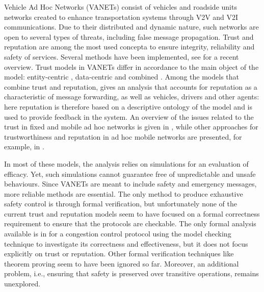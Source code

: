 \documentclass[compsoc, conference, letterpaper, 10pt, times]{IEEEtran}
\begin{document}
Vehicle Ad Hoc Networks (VANETs) consist of vehicles and roadside units networks created to enhance transportation systems through V2V and V2I communications. Due to their distributed and dynamic nature, such networks are open to several types of threats, including false message propagation. Trust and reputation are among the  most used concepta to ensure integrity, reliability and safety of services. Several methods have been implemented, see \cite{Soleymani2015} for a recent overview. Trust models in VANETs differ in accordance to the main object of the model: entity-centric \cite{5641621, GomezMarmol:2012:TTR:2160992.2161100}, data-centric \cite{conf/infocom/RayaPGH08, Lo2009} and combined \cite{Wei2012}. Among the models that combine trust and reputation, \cite{glenford} gives an analysis that accounts for reputation as a characteristic of message forwarding, as well as vehicles, drivers and other agents: here reputation is therefore based on a descriptive ontology of the model and is used to provide feedback in the system. An overview of the issues related to the trust in fixed and mobile ad hoc networks is given in \cite{DBLP:conf/vtc/WexBHLD08}, while other approaches for trustworthiness and reputation in ad hoc mobile networks are presented, for example, in \cite{DBLP:conf/um/FinnsonZTMC12, DBLP:journals/ijaisc/ChaurasiaTV15}.

In most of these models, the analysis relies on simulations for an evaluation of efficacy. Yet, such simulations cannot guarantee free of unpredictable and unsafe behaviours. Since VANETs are meant to include safety and emergency messages, more reliable methods are essential. The only method to produce exhaustive safety control is through formal verification, but unfortunately none of the current trust and reputation models seem to have focused on a formal correctness requirement to ensure that the protocols are checkable. The only formal analysis available is in \cite{DBLP:conf/vtc/KonurF11} for a congestion control protocol using the model checking technique to investigate its correctness and effectiveness, but it does not focus explicitly on trust or reputation. Other formal verification techniques like theorem proving seem to have been ignored so far. Moreover, an additional problem, i.e.,  ensuring that safety is preserved over transitive operations, remains unexplored. 
\end{document}
